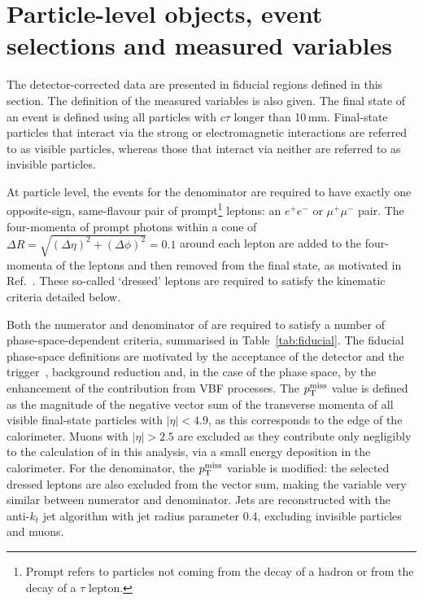 \documentclass[cernpreprint,txfonts,UKenglish,texlive=2016]{\ATLASLATEXPATH atlasdoc}
\begin{document}
\section{Particle-level objects, event selections and measured variables}
\label{sec:particle}
The detector-corrected data are presented in fiducial regions defined in this
section. The definition of the measured variables is also given.
The final state of an event is defined using all particles with $c\tau$ longer than 10\,mm. 
Final-state particles that interact via the
strong or electromagnetic interactions are referred to as
visible particles, whereas those that interact via neither are referred 
to as invisible particles.

At particle level, the \lljet{} events for the denominator are required to
have exactly one opposite-sign, same-flavour pair of prompt\footnote{Prompt refers to particles not coming from the
decay of a hadron or from the decay of a $\tau$ lepton.} leptons: an $e^+e^-$ or
$\mu^+\mu^-$ pair. The four-momenta of prompt photons
within a cone of $\Delta R= \sqrt{(\Delta\eta)^2 + (\Delta\phi)^2} = 0.1$
around each lepton
are added to the four-momenta of the leptons and then removed from
the final state, as motivated in Ref.~\cite{ATL-PHYS-PUB-2015-013}.
These so-called `dressed' leptons are required to satisfy the kinematic
criteria detailed below. 

Both the numerator and denominator of \Rmiss{} are
required to satisfy a number of phase-space-dependent criteria,
summarised in Table~\ref{tab:fiducial}.
The fiducial phase-space definitions are motivated by the
acceptance of the detector and the
trigger~\cite{TRIG-2016-01}, background reduction and, in the case of the \vbf{} phase space,
by the enhancement of the contribution from VBF processes. 
The $p_\mathrm{T}^\mathrm{miss}$ value is defined as the magnitude of the negative vector sum of the transverse momenta of all visible 
final-state particles with $|\eta|<4.9$, as this corresponds to the
edge of the calorimeter. Muons with $|\eta| > 2.5$ are
excluded as they
contribute only negligibly to the calculation of \ptmiss{} in this analysis, via a small
energy deposition in the calorimeter.
For the denominator, the $p_\mathrm{T}^\mathrm{miss}$ variable is modified: the selected
dressed leptons are also excluded from the vector sum, making the variable very similar between numerator and denominator.
Jets are
reconstructed with the anti-$k_t$ jet algorithm with jet radius
parameter 0.4, excluding
invisible particles and muons. 
\end{document}
